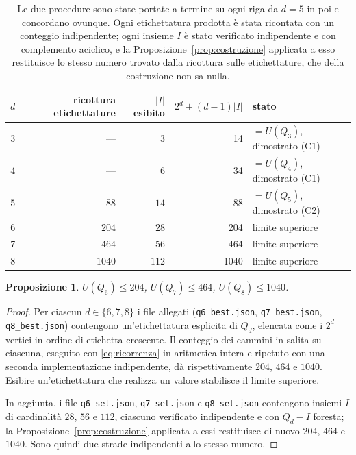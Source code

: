 \documentclass[11pt,a4paper]{article}
\theoremstyle{plain}
\newtheorem{proposition}{Proposizione}
\theoremstyle{definition}
\newcommand{\Qd}{Q_d}
\begin{document}
\begin{table}[h]
\centering
\begin{tabular}{crrrl}
\toprule
$d$ & ricottura etichettature & $|I|$ esibito & $2^d+(d-1)|I|$ & stato\\
\midrule
3 & ---    & $3$   & 14   & $=U(Q_3)$, dimostrato (C1)\\
4 & ---    & $6$   & 34   & $=U(Q_4)$, dimostrato (C1)\\
5 & $88$   & $14$  & 88   & $=U(Q_5)$, dimostrato (C2)\\
6 & $204$  & $28$  & 204  & limite superiore\\
7 & $464$  & $56$  & 464  & limite superiore\\
8 & $1040$ & $112$ & 1040 & limite superiore\\
\bottomrule
\end{tabular}
\caption{Le due procedure sono state portate a termine su ogni riga da $d=5$ in
poi e concordano ovunque. Ogni etichettatura prodotta è stata ricontata con un
conteggio indipendente; ogni insieme $I$ è stato verificato indipendente e con
complemento aciclico, e la Proposizione~\ref{prop:costruzione} applicata a esso
restituisce lo stesso numero trovato dalla ricottura sulle etichettature, che
della costruzione non sa nulla.}
\label{tab:risultati}
\end{table}

\begin{proposition}\label{prop:bound}
$U(Q_6)\le 204$, \quad $U(Q_7)\le 464$, \quad $U(Q_8)\le 1040$.
\end{proposition}

\begin{proof}
Per ciascun $d\in\{6,7,8\}$ i file allegati
(\texttt{q6\_best.json}, \texttt{q7\_best.json}, \texttt{q8\_best.json})
contengono un'etichettatura esplicita di $\Qd$, elencata come i $2^d$ vertici in
ordine di etichetta crescente. Il conteggio dei cammini in salita su ciascuna,
eseguito con \eqref{eq:ricorrenza} in aritmetica intera e ripetuto con una
seconda implementazione indipendente, dà rispettivamente $204$, $464$ e $1040$.
Esibire un'etichettatura che realizza un valore stabilisce il limite superiore.

In aggiunta, i file \texttt{q6\_set.json}, \texttt{q7\_set.json} e
\texttt{q8\_set.json} contengono insiemi $I$ di cardinalità $28$, $56$ e $112$,
ciascuno verificato indipendente e con $\Qd-I$ foresta; la
Proposizione~\ref{prop:costruzione} applicata a essi restituisce di nuovo $204$,
$464$ e $1040$. Sono quindi due strade indipendenti allo stesso numero.
\end{proof}
\end{document}
